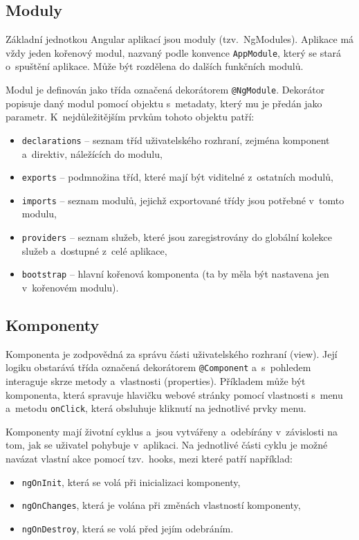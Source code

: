 \documentclass[
  digital, %
  oneside, %
  table,   %
  nolof,     %
  nolot,     %
  nocover
]{fithesis3}
\begin{document}
\subsection{Moduly}
Základní jednotkou Angular aplikací jsou moduly (tzv.~NgModules). Aplikace má vždy jeden kořenový modul, nazvaný podle konvence \verb|AppModule|, který se stará o~spuštění aplikace. Může být rozdělena do dalších funkčních modulů.\par
Modul je definován jako třída označená dekorátorem \verb|@NgModule|. Dekorátor popisuje daný modul pomocí objektu s~metadaty, který mu je předán jako parametr. K~nejdůležitějším prvkům tohoto objektu patří: \cite{angulario}
\begin{itemize}
  \item \verb|declarations| – seznam tříd uživatelského rozhraní, zejména komponent a~direktiv, náležících do modulu,
  \item \verb|exports| – podmnožina tříd, které mají být viditelné z~ostatních modulů,
  \item \verb|imports| – seznam modulů, jejichž exportované třídy jsou potřebné v~tomto modulu,
  \item \verb|providers| – seznam služeb, které jsou zaregistrovány do globální kolekce služeb a~dostupné z~celé aplikace,
  \item \verb|bootstrap| – hlavní kořenová komponenta (ta by měla být nastavena jen v~kořenovém modulu).
\end{itemize}

\subsection{Komponenty}
Komponenta je zodpovědná za správu části uživatelského rozhraní (view). Její logiku obstarává třída označená dekorátorem \verb|@Component| a~s~pohledem interaguje skrze metody a~vlastnosti (properties). Příkladem může být komponenta, která spravuje hlavičku webové stránky pomocí vlastnosti s~menu a~metodu \verb|onClick|, která obsluhuje kliknutí na jednotlivé prvky menu.\par
Komponenty mají životní cyklus a~jsou vytvářeny a~odebírány v~závislosti na tom, jak se uživatel pohybuje v~aplikaci. Na jednotlivé části cyklu je možné navázat vlastní akce pomocí tzv.~hooks, mezi které patří například: \cite{angulario}
\begin{itemize}
  \item \verb|ngOnInit|, která se volá při inicializaci komponenty,
  \item \verb|ngOnChanges|, která je volána při změnách vlastností komponenty,
  \item \verb|ngOnDestroy|, která se volá před jejím odebráním.
\end{itemize}
\end{document}
